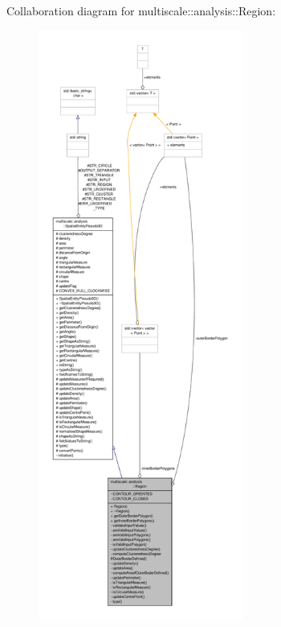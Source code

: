 Collaboration diagram for multiscale\-:\-:analysis\-:\-:Region\-:\nopagebreak
\begin{figure}[H]
\begin{center}
\leavevmode
\includegraphics[height=550pt]{classmultiscale_1_1analysis_1_1Region__coll__graph}
\end{center}
\end{figure}
